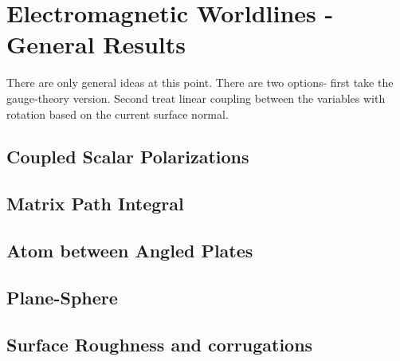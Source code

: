 \chapter{Electromagnetic Worldlines - General Results}
\label{ch:general}
There are only general ideas at this point.
There are two options- first take the gauge-theory version.
Second treat linear coupling between the variables with rotation based on the current surface normal.

\section{Coupled Scalar Polarizations}

\section{Matrix Path Integral}

    \section{Atom between Angled Plates}
    \section{Plane-Sphere}
    \section{Surface Roughness and corrugations}


